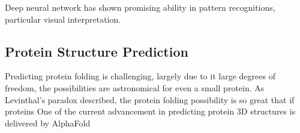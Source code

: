 Deep neural network has shown promising ability in pattern recognitions, particular visual interpretation.
\par 

\subsection{Protein Structure Prediction}
Predicting protein folding is challenging, largely due to it large degrees of freedom, the possibilities are astronomical for even a small protein. As Levinthal's paradox described, the protein folding possibility is so great that if proteins  One of the current advancement in predicting protein 3D structures is delivered by AlphaFold